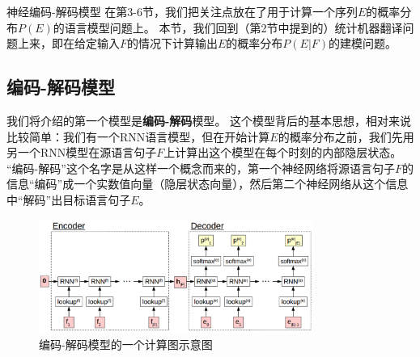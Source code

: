 \documentclass[10pt,a4paper]{ctexart}
\makeatletter
\renewcommand{\section}{\@startsection{section}{1}{0mm}
  {-\baselineskip}{0.5\baselineskip}{\bf\leftline}}
\makeatother
\begin{document}

\newpage

\section{神经编码-解码模型}
在第3-6节，我们把关注点放在了用于计算一个序列$E$的概率分布$P(E)$的语言模型问题上。
本节，我们回到（第2节中提到的）统计机器翻译问题上来，即在给定输入$F$的情况下计算输出$E$的概率分布$P(E | F)$的建模问题。

\subsection{编码-解码模型}
我们将介绍的第一个模型是\textbf{编码-解码}模型\cite{chrisman1991learning,forcada1997recursive,kalchbrenner2013recurrent,sutskever2014sequence}。
这个模型背后的基本思想，相对来说比较简单：我们有一个RNN语言模型，但在开始计算$E$的概率分布之前，我们先用另一个RNN模型在源语言句子$F$上计算出这个模型在每个时刻的内部隐层状态。
“编码-解码”这个名字是从这样一个概念而来的，第一个神经网络将源语言句子$F$的信息“编码”成一个实数值向量（隐层状态向量），然后第二个神经网络从这个信息中“解码”出目标语言句子$E$。

\begin{figure}[H]
\centering
\includegraphics[width=0.8\textwidth]{fig21.png}
\caption{编码-解码模型的一个计算图示意图}
\label{fig:21}
\end{figure}
\end{document}
